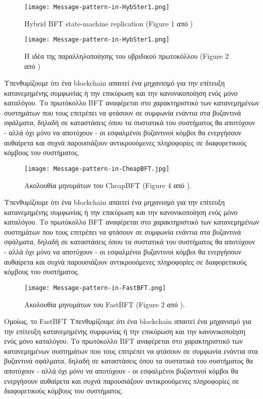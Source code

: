 \begin{figure}[H]
 \centering
  \texttt{[image: Message-pattern-in-HybSter1.png]}
  \caption{Hybrid BFT state-machine replication (Figure 1 από \cite{hybster})}
  \label{fig:hybster1}
\end{figure}

\begin{figure}[H]
 \centering
  \texttt{[image: Message-pattern-in-HybSter1.png]}
  \caption{Η ιδέα της παραλληλοποίησης του υβριδικού πρωτοκόλλου (Figure 2 από \cite{hybster})}
  \label{fig:hybster2}
\end{figure}

Υπενθυμίζουμε ότι ένα blockchain απαιτεί ένα μηχανισμό για την επίτευξη κατανεμημένης συμφωνίας ή την επικύρωση και την κανονικοποίηση ενός μόνο καταλόγου. Το πρωτόκολλο BFT αναφέρεται στο χαρακτηριστικό των κατανεμημένων συστημάτων που τους επιτρέπει να φτάσουν σε συμφωνία ενάντια στα βυζαντινά σφάλματα, δηλαδή σε καταστάσεις όπου τα συστατικά του συστήματος θα αποτύχουν - αλλά όχι μόνο να αποτύχουν - οι εσφαλμένοι βυζαντινοί κόμβοι θα ενεργήσουν αυθαίρετα και συχνά παρουσιάζουν αντικρουόμενες πληροφορίες σε διαφορετικούς κόμβους του συστήματος.


\begin{figure}[H]
 \centering
  \texttt{[image: Message-pattern-in-CheapBFT.jpg]}
  \caption{Ακολουθία μηνυμάτων του CheapBFT (Figure 4 από \cite{cheapbft}).}
  \label{fig:cheapbftpatterns1}
\end{figure}

Υπενθυμίζουμε ότι ένα blockchain απαιτεί ένα μηχανισμό για την επίτευξη κατανεμημένης συμφωνίας ή την επικύρωση και την κανονικοποίηση ενός μόνο καταλόγου. Το πρωτόκολλο BFT αναφέρεται στο χαρακτηριστικό των κατανεμημένων συστημάτων που τους επιτρέπει να φτάσουν σε συμφωνία ενάντια στα βυζαντινά σφάλματα, δηλαδή σε καταστάσεις όπου τα συστατικά του συστήματος θα αποτύχουν - αλλά όχι μόνο να αποτύχουν - οι εσφαλμένοι βυζαντινοί κόμβοι θα ενεργήσουν αυθαίρετα και συχνά παρουσιάζουν αντικρουόμενες πληροφορίες σε διαφορετικούς κόμβους του συστήματος.

\begin{figure}[H]
 \centering
  \texttt{[image: Message-pattern-in-FastBFT.png]}
  \caption{Ακολουθία μηνυμάτων του FastBFT (Figure 2 από \cite{fastbft}).}
  \label{fig:fastbftpatterns1}
\end{figure}

Ομοίως, το FastBFT \cite{fastbft} Υπενθυμίζουμε ότι ένα blockchain απαιτεί ένα μηχανισμό για την επίτευξη κατανεμημένης συμφωνίας ή την επικύρωση και την κανονικοποίηση ενός μόνο καταλόγου. Το πρωτόκολλο BFT αναφέρεται στο χαρακτηριστικό των κατανεμημένων συστημάτων που τους επιτρέπει να φτάσουν σε συμφωνία ενάντια στα βυζαντινά σφάλματα, δηλαδή σε καταστάσεις όπου τα συστατικά του συστήματος θα αποτύχουν - αλλά όχι μόνο να αποτύχουν - οι εσφαλμένοι βυζαντινοί κόμβοι θα ενεργήσουν αυθαίρετα και συχνά παρουσιάζουν αντικρουόμενες πληροφορίες σε διαφορετικούς κόμβους του συστήματος.
